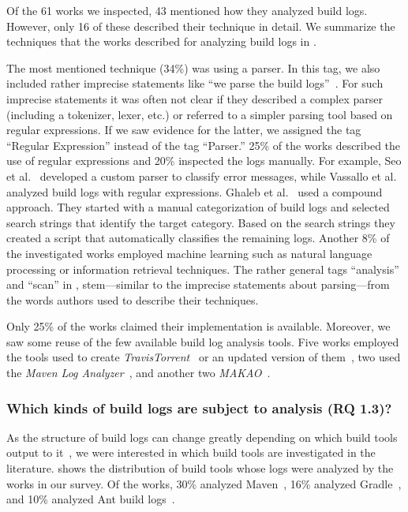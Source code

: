 Of the 61 works we inspected, 43 mentioned how they analyzed
build logs.
However, only 16 of these described their technique in detail.
We summarize the techniques that the works
described for analyzing build logs in .

The most mentioned technique (34\%) was using a parser.
In this tag, we also
included
rather imprecise statements like ``we parse the build
logs''~\cite{rahman2018impact}.
For such imprecise statements it was often not clear if they described
a complex parser (including a tokenizer, lexer, etc.) or referred to a
simpler parsing tool based on regular expressions.
If we saw evidence for the latter, we assigned the tag
``Regular Expression'' instead of the tag ``Parser.''
25\% of the works described the use of regular expressions and 20\%
inspected the logs manually.
For example,
Seo et al.~\cite{seo2014programmers} developed a custom
parser to classify error messages, while Vassallo et
al.~\cite{vassallo2017a-tale} analyzed build logs with regular
expressions.
Ghaleb et al.~\cite{ghaleb2019studying} used a compound approach.
They started with a manual categorization of build logs and selected
search strings that identify the target category.
Based on the search strings they created a script that automatically
classifies the remaining logs.
Another 8\% of the investigated works
employed machine learning such as natural language
processing or information retrieval techniques.
The rather general tags ``analysis'' and ``scan'' in
, stem---similar to the imprecise
statements about parsing---from the
words authors used to describe their techniques.


Only 25\% of the works claimed their implementation is available.
Moreover, we
saw some reuse of the few available build log analysis tools.
Five works employed the tools used to create
\emph{TravisTorrent}~\cite{beller2017oops,
orellana2017differences,zhao2018comparing} or
an updated version of them~\cite{rott2019empirische,
shi2018evaluating}, two used the
\emph{Maven Log Analyzer}~\cite{macho2018automatically,gallaba2018noise},
and
another two
\emph{MAKAO}~\cite{wen2018blimp,adams2007design}.

\subsubsection{Which kinds of build logs are subject to
  analysis (RQ 1.3)?}
As the structure of build logs can change greatly depending on which
build tools output to it~\cite{staahl2014modeling},
we were interested in which build tools are
investigated in the literature.
 shows the distribution of
build tools whose logs were analyzed by the works in our survey.
Of the works, 30\% analyzed
Maven~\cite{maven2019website},
16\% analyzed Gradle~\cite{gradle2020website},
and 10\% analyzed Ant build logs~\cite{ant2020website}.

